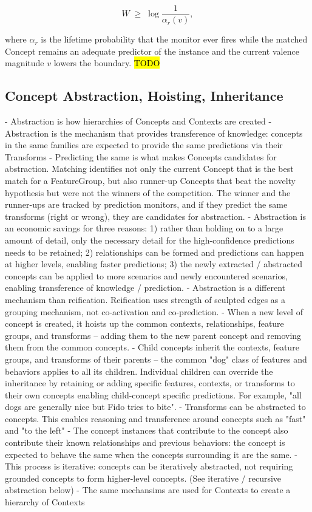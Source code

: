 \documentclass{article}
\begin{document}
$$
W \;\geq\; \log \frac{1}{\alpha_r(v)},
$$

where $\alpha_r$ is the lifetime probability that the monitor ever fires while the matched Concept remains an adequate predictor of the instance and the current valence magnitude $v$ lowers the boundary. \hl{TODO}

\subsection{Concept Abstraction, Hoisting, Inheritance}\label{sec:abstraction}
- Abstraction is how hierarchies of Concepts and Contexts are created
- Abstraction is the mechanism that provides transference of knowledge: concepts in the same families are expected to provide the same predictions via their Transforms
- Predicting the same is what makes Concepts candidates for abstraction. Matching identifies not only the current Concept that is the best match for a FeatureGroup, but also runner-up Concepts that beat the novelty hypothesis but were not the winners of the competition. The winner and the runner-ups are tracked by prediction monitors, and if they predict the same transforms (right or wrong), they are candidates for abstraction.
- Abstraction is an economic savings for three reasons: 1) rather than holding on to a large amount of detail, only the necessary detail for the high-confidence predictions needs to be retained; 2) relationships can be formed and predictions can happen at higher levels, enabling faster predictions; 3) the newly extracted / abstracted concepts can be applied to more scenarios and newly encountered scenarios, enabling transference of knowledge / prediction.
- Abstraction is a different mechanism than reification. Reification uses strength of sculpted edges as a grouping mechanism, not co-activation and co-prediction.
- When a new level of concept is created, it hoists up the common contexts, relationships, feature groups, and transforms -- adding them to the new parent concept and removing them from the common concepts.
- Child concepts inherit the contexts, feature groups, and transforms of their parents -- the common "dog" class of features and behaviors applies to all its children. Individual children can override the inheritance by retaining or adding specific features, contexts, or transforms to their own concepts enabling child-concept specific predictions. For example, "all dogs are generally nice but Fido tries to bite".
- Transforms can be abstracted to concepts. This enables reasoning and transference around concepts such as "fast" and "to the left"
- The concept instances that contribute to the concept also contribute their known relationships and previous behaviors: the concept is expected to behave the same when the concepts surrounding it are the same.
- This process is iterative: concepts can be iteratively abstracted, not requiring grounded concepts to form higher-level concepts. (See iterative / recursive abstraction below)
- The same mechansims are used for Contexts to create a hierarchy of Contexts
\end{document}
